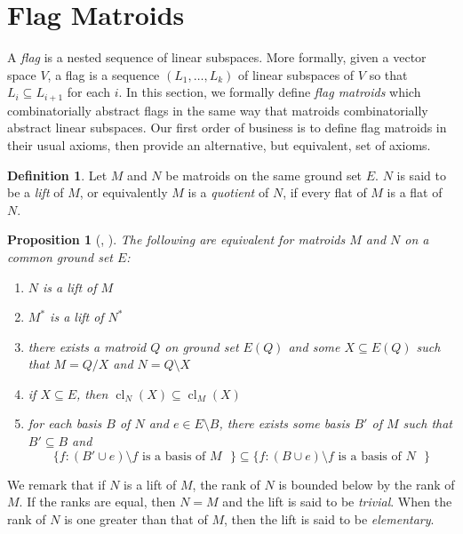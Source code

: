 \documentclass[12pt]{article}
\newtheorem{prop}[thm]{Proposition}
\theoremstyle{definition}
\newtheorem{definition}[thm]{Definition}
\DeclareMathOperator{\cl}{cl}
\begin{document}
\section{Flag Matroids}\label{section: flag matroids}
A \emph{flag} is a nested sequence of linear subspaces.
More formally, given a vector space $V$, a flag is a sequence $(L_1,\dots,L_k)$
of linear subspaces of $V$ so that $L_i \subseteq L_{i+1}$ for each $i$.
In this section, we formally define \emph{flag matroids}
which combinatorially abstract flags in the same way that matroids combinatorially abstract linear subspaces.
Our first order of business is to define flag matroids in their usual axioms,
then provide an alternative, but equivalent, set of axioms.

\begin{definition}
    Let $M$ and $N$ be matroids on the same ground set $E$. $N$ is said to be a \emph{lift} of $M$, or equivalently $M$ is a \emph{quotient} of $N$, if every flat of $M$ is a flat of $N$.
\end{definition}

\begin{prop}[{\cite[Proposition 7.4.7]{white1986theory}}, {\cite[Proposition 7.3.6]{oxley}}]\label{prop: equivalent characterizations of lifts}
    The following are equivalent for matroids $M$ and $N$ on a common ground set $E$:
    \begin{enumerate}
        \item $N$ is a lift of $M$
        \item $M^*$ is a lift of $N^*$
        \item there exists a matroid $Q$ on ground set $E(Q)$ and some $X \subseteq E(Q)$ such that $M = Q / X$ and $N = Q \setminus X$
        \item if $X \subseteq E$, then $\cl_N(X) \subseteq \cl_M(X)$
        \item for each basis $B$ of $N$ and $e \in E\setminus B$, there exists some basis $B'$ of $M$ such that $B' \subseteq B$ and
        \begin{equation*}
            \{f : (B'\cup e)\setminus f \text{ is a basis of $M$ }\} \subseteq \{f : (B\cup e)\setminus f \text{ is a basis of $N$ }\}
        \end{equation*}
    \end{enumerate}
\end{prop}

We remark that if $N$ is a lift of $M$, the rank of $N$ is bounded below by the rank of $M$. If the ranks are equal, then $N = M$ and the lift is said to be \emph{trivial}. When the rank of $N$ is one greater than that of $M$, then the lift is said to be \emph{elementary}.
\end{document}
